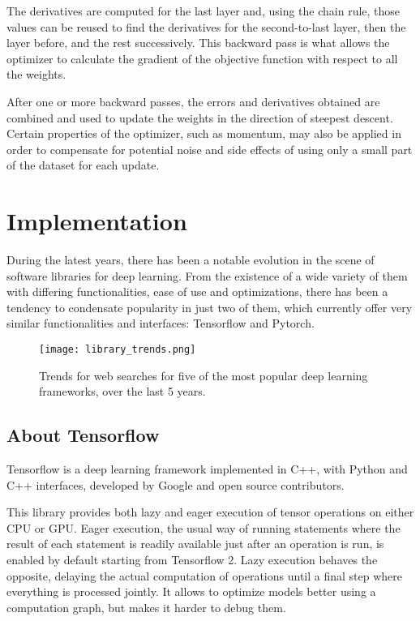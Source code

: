 The derivatives are computed for the last layer and, using the chain rule, those values can be reused to find the derivatives for the second-to-last layer, then the layer before, and the rest successively. This backward pass is what allows the optimizer to calculate the gradient of the objective function with respect to all the weights. 

After one or more backward passes, the errors and derivatives obtained are combined and used to update the weights in the direction of steepest descent. Certain properties of the optimizer, such as momentum, may also be applied in order to compensate for potential noise and side effects of using only a small part of the dataset for each update.

\section{Implementation}

During the latest years, there has been a notable evolution in the scene of software libraries for deep learning. From the existence of a wide variety of them with differing functionalities, ease of use and optimizations, there has been a tendency to condensate popularity in just two of them, which currently offer very similar functionalities and interfaces: Tensorflow and Pytorch.

\begin{figure*}[htbp]
    \centering  
    \texttt{[image: library\_trends.png]}
    \caption{Trends for web searches for five of the most popular deep learning frameworks, over the last 5 years.}
    \label{fig:trends}
\end{figure*}

\subsection{About Tensorflow}

Tensorflow is a deep learning framework implemented in C++, with Python and C++ interfaces, developed by Google and open source contributors.

This library provides both lazy and eager execution of tensor operations on either CPU or GPU. Eager execution, the usual way of running statements where the result of each statement is readily available just after an operation is run, is enabled by default starting from Tensorflow 2. Lazy execution behaves the opposite, delaying the actual computation of operations until a final step where everything is processed jointly. It allows to optimize models better using a computation graph, but makes it harder to debug them.

